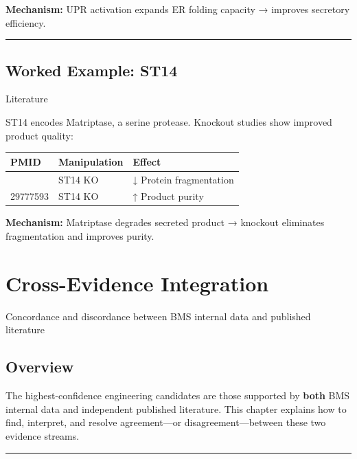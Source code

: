 \documentclass[
  letterpaper,
  oneside,
  open=any]{scrbook}
\newcounter{none} %
\begin{document}
\textbf{Mechanism:} UPR activation expands ER folding capacity →
improves secretory efficiency.

\begin{center}\rule{0.5\linewidth}{0.5pt}\end{center}

\section{Worked Example: ST14}\label{worked-example-st14}

{Literature}

ST14 encodes Matriptase, a serine protease. Knockout studies show
improved product quality:

{\def\LTcaptype{none} %
\begin{longtable}[]{@{}lll@{}}
\toprule\noalign{}
PMID & Manipulation & Effect \\
\midrule\noalign{}
\endhead
\bottomrule\noalign{}
\endlastfoot
29777593 & ST14 KO & ↓ Protein fragmentation \\
29777593 & ST14 KO & ↑ Product purity \\
\end{longtable}
}

\textbf{Mechanism:} Matriptase degrades secreted product → knockout
eliminates fragmentation and improves purity.


\chapter{Cross-Evidence Integration}\label{cross-evidence-integration}

Concordance and discordance between BMS internal data and published
literature

\hfill\break

\section{Overview}\label{sec-cross-evidence}

The highest-confidence engineering candidates are those supported by
\textbf{both} BMS internal data and independent published literature.
This chapter explains how to find, interpret, and resolve agreement---or
disagreement---between these two evidence streams.

\begin{center}\rule{0.5\linewidth}{0.5pt}\end{center}
\end{document}
